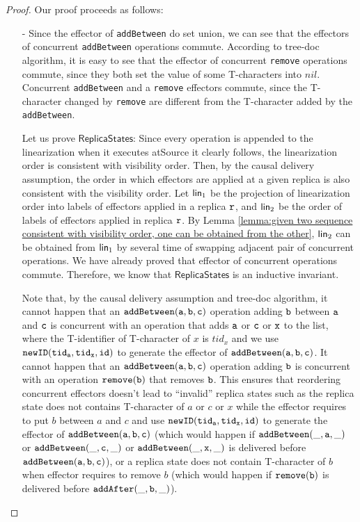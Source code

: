 \begin {proof}
Our proof proceeds as follows:

\begin{itemize}
\setlength{\itemsep}{0.5pt}
\item[-] Since the effector of {\tt addBetween} do set union, we can see that the effectors of concurrent {\tt addBetween} operations commute. According to tree-doc algorithm, it is easy to see that the effector of concurrent {\tt remove} operations commute, since they both set the value of some T-characters into $nil$. Concurrent {\tt addBetween} and a {\tt remove} effectors commute, since the T-character changed by {\tt remove} are different from the T-character added by the {\tt addBetween}.

    Let us prove $\mathsf{ReplicaStates}$: Since every operation is appended to the linearization when it executes atSource it clearly follows, the linearization order is consistent with visibility order. Then, by the causal delivery assumption, the order in which effectors are applied at a given replica is also consistent with the visibility order. Let $\mathsf{lin}_1$ be the projection of linearization order into labels of effectors applied in a replica $\mathtt{r}$, and $\mathsf{lin}_2$ be the order of labels of effectors applied in replica $\mathtt{r}$. By Lemma \ref{lemma:given two sequence consistent with visibility order, one can be obtained from the other}, $\mathsf{lin}_2$ can be obtained from $\mathsf{lin}_1$ by several time of swapping adjacent pair of concurrent operations. We have already proved that effector of concurrent operations commute. Therefore, we know that $\mathsf{ReplicaStates}$ is an inductive invariant.

    Note that, by the causal delivery assumption and tree-doc algorithm, it cannot happen that an $\alabelshort[{\tt addBetween}]{a,b,c}$ operation adding ${\tt b}$ between ${\tt a}$ and ${\tt c}$ is concurrent with an operation that adds ${\tt a}$ or ${\tt c}$ or ${\tt x}$ to the list, where the T-identifier of T-character of $x$ is $tid_x$ and we use $\alabelshort[{\tt newID}]{tid_a,tid_x,id}$ to generate the effector of $\alabelshort[{\tt addBetween}]{a,b,c}$. It cannot happen that an $\alabelshort[{\tt addBetween}]{a,b,c}$ operation adding ${\tt b}$ is concurrent with an operation $\alabelshort[{\tt remove}]{b}$ that removes ${\tt b}$. This ensures that reordering concurrent effectors doesn't lead to ``invalid'' replica states such as the replica state does not contains T-character of $a$ or $c$ or $x$ while the effector requires to put $b$ between $a$ and $c$ and use $\alabelshort[{\tt newID}]{tid_a,tid_x,id}$ to generate the effector of $\alabelshort[{\tt addBetween}]{a,b,c}$ (which would happen if $\alabelshort[{\tt addBetween}]{\_,a,\_}$ or $\alabelshort[{\tt addBetween}]{\_,c,\_}$ or $\alabelshort[{\tt addBetween}]{\_,x,\_}$ is delivered before $\alabelshort[{\tt addBetween}]{a,b,c}$), or a replica state does not contain T-character of $b$ when effector requires to remove $b$ (which would happen if $\alabelshort[{\tt remove}]{b}$ is delivered before $\alabelshort[{\tt addAfter}]{\_,b,\_}$).


\end{itemize}
\end{proof}
